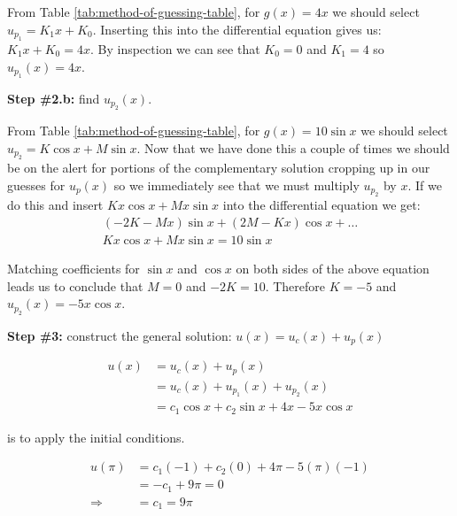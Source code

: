\vspace{0.25cm}

\noindent From Table \ref{tab:method-of-guessing-table}, for $g(x)=4x$ we should select $u_{p_1} = K_1x+K_0$.  Inserting this into the differential equation gives us: $K_1x + K_0 = 4x$.  By inspection we can see that $K_0 = 0$ and $K_1 = 4$ so $u_{p_1}(x) = 4x$.  

\vspace{0.25cm}

\noindent\textbf{Step \#2.b: } find $u_{p_2}(x)$.

\vspace{0.25cm}

\noindent From Table \ref{tab:method-of-guessing-table}, for $g(x)=10\sin{x}$ we should select $u_{p_2} =  K\cos{x}+M\sin{x}$. Now that we have done this a couple of times we should be on the alert for portions of the complementary solution cropping up in our guesses for $u_p(x)$ so we immediately see that we must multiply $u_{p_2}$ by $x$.  If we do this and insert $Kx\cos{x}+Mx\sin{x}$ into the differential equation we get:
\begin{multline*}
\left(-2K-Mx\right)\sin{x}+\left(2M-Kx\right)\cos{x} + \dots \\ Kx\cos{x}+Mx\sin{x} = 10\sin{x}
\end{multline*}

\vspace{0.25cm}

\noindent Matching coefficients for $\sin{x}$ and $\cos{x}$ on both sides of the above equation leads us to conclude that $M=0$ and $-2K = 10$.  Therefore $K = -5$ and $u_{p_2}(x)=-5x\cos{x}$.

\vspace{0.25cm}

\noindent\textbf{Step \#3:} construct the general solution: $u(x)=u_c(x)+u_p(x)$

\begin{align*}
u(x) &= u_c(x) + u_p(x) \\ 
&= u_c(x) + u_{p_1}(x)+u_{p_2}(x) \\
&= c_1\cos{x}+c_2\sin{x}+4x-5x\cos{x}
\end{align*}

 is to apply the initial conditions.  

\begin{align*}
u(\pi) &= c_1(-1)+c_2(0)+4\pi -5(\pi)(-1) \\
&=-c_1+9\pi = 0 \\
\Rightarrow &= c_1 = 9\pi
\end{align*}

